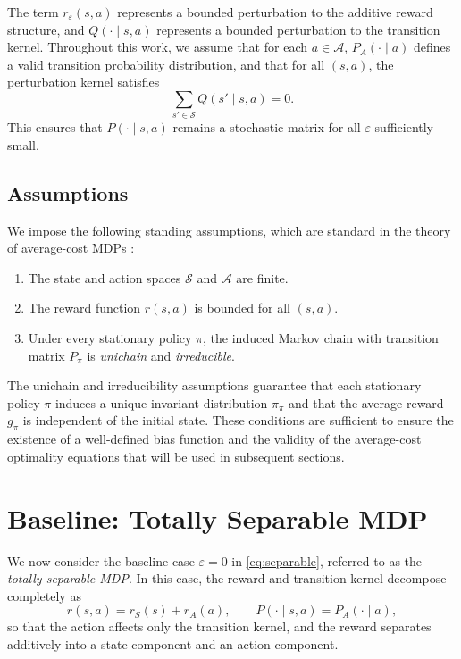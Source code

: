 \documentclass{article}
\begin{document}
The term $r_\varepsilon(s,a)$ represents a bounded perturbation to the additive reward structure, and $Q(\cdot \mid s,a)$ represents a bounded perturbation to the transition kernel.  
Throughout this work, we assume that for each $a \in \mathcal{A}$, $P_A(\cdot \mid a)$ defines a valid transition probability distribution, and that for all $(s,a)$, the perturbation kernel satisfies
\[
\sum_{s' \in \mathcal{S}} Q(s' \mid s,a) = 0.
\]
This ensures that $P(\cdot \mid s,a)$ remains a stochastic matrix for all $\varepsilon$ sufficiently small.

\subsection{Assumptions}

We impose the following standing assumptions, which are standard in the theory of average-cost MDPs \cite{Puterman1994,Bertsekas2012,HernandezLerma1999}:
\begin{enumerate}
    \item The state and action spaces $\mathcal{S}$ and $\mathcal{A}$ are finite.
    \item The reward function $r(s,a)$ is bounded for all $(s,a)$.
    \item Under every stationary policy $\pi$, the induced Markov chain with transition matrix $P_\pi$ is \emph{unichain} and \emph{irreducible}.
\end{enumerate}

The unichain and irreducibility assumptions guarantee that each stationary policy $\pi$ induces a unique invariant distribution $\pi_\pi$ and that the average reward $g_\pi$ is independent of the initial state.  
These conditions are sufficient to ensure the existence of a well-defined bias function and the validity of the average-cost optimality equations that will be used in subsequent sections.




\section{Baseline: Totally Separable MDP}

We now consider the baseline case $\varepsilon = 0$ in \eqref{eq:separable}, referred to as the \textit{totally separable MDP}. In this case, the reward and transition kernel decompose completely as
\[
r(s,a) = r_S(s) + r_A(a), \qquad P(\cdot \mid s,a) = P_A(\cdot \mid a),
\]
so that the action affects only the transition kernel, and the reward separates additively into a state component and an action component.
\end{document}
